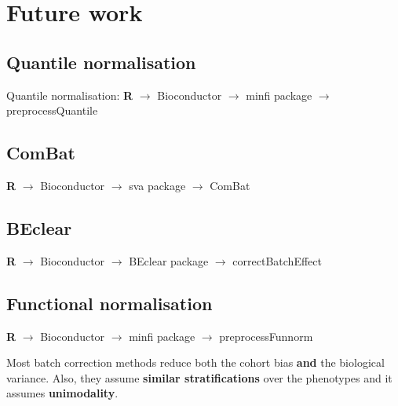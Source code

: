 \documentclass[a4paper,10pt]{article}
\begin{document}
\section{Future work}
\subsection{Quantile normalisation}
%
Quantile normalisation: \textbf{R} $\rightarrow$ Bioconductor $\rightarrow$ minfi package $\rightarrow$ preprocessQuantile

\subsection{ComBat}
%
\textbf{R} $\rightarrow$ Bioconductor $\rightarrow$ sva package $\rightarrow$ ComBat

\subsection{BEclear}

\textbf{R} $\rightarrow$ Bioconductor $\rightarrow$ BEclear package $\rightarrow$ correctBatchEffect

\subsection{Functional normalisation}

\textbf{R} $\rightarrow$ Bioconductor $\rightarrow$ minfi package $\rightarrow$ preprocessFunnorm

Most batch correction methods reduce both the cohort bias \textbf{and} the biological variance.
Also, they assume \textbf{similar stratifications} over the phenotypes and it assumes \textbf{unimodality}.



\end{document}
